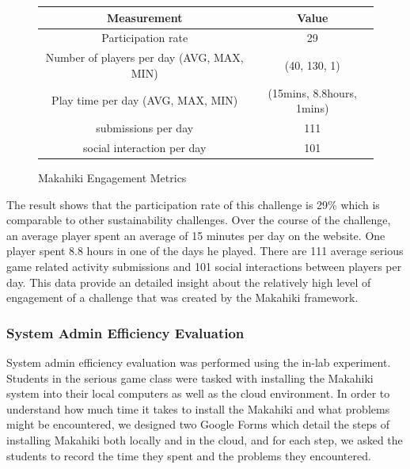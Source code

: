 \documentclass{sigchi}
\newcommand\tabhead[1]{\small\textbf{#1}}
\begin{document}
\begin{figure}[ht!]
  \centering
  \begin{tabular}{|c|c|}
    \hline
    \multicolumn{1}{|p{0.5\columnwidth}|}{\centering\tabhead{Measurement}} &
    \multicolumn{1}{|p{0.5\columnwidth}|}{\centering\tabhead{Value}} \\
    \hline
    \multicolumn{1}{|p{0.5\columnwidth}|}{Participation rate} &
    \multicolumn{1}{|p{0.5\columnwidth}|}{29} \\
    \hline
    \multicolumn{1}{|p{0.5\columnwidth}|}{Number of players per day (AVG, MAX, MIN)} &
    \multicolumn{1}{|p{0.5\columnwidth}|}{(40, 130, 1)} \\
    \hline
    \multicolumn{1}{|p{0.5\columnwidth}|}{Play time per day (AVG, MAX, MIN)} &
    \multicolumn{1}{|p{0.5\columnwidth}|}{(15mins, 8.8hours, 1mins)} \\
    \hline
    \multicolumn{1}{|p{0.5\columnwidth}|}{submissions per day} &
    \multicolumn{1}{|p{0.5\columnwidth}|}{111} \\
    \hline
    \multicolumn{1}{|p{0.5\columnwidth}|}{social interaction per day} &
    \multicolumn{1}{|p{0.5\columnwidth}|}{101} \\
    \hline
  \end{tabular}
  \caption{Makahiki Engagement Metrics}
  \label{fig:makahiki-engagement}
\end{figure}

The result shows that the participation rate of this challenge is 29\% which is comparable to other sustainability challenges. Over the course of the challenge, an average player spent an average of 15 minutes per day on the website. One player spent 8.8 hours in one of the days he played. There are 111 average serious game related activity submissions and 101 social interactions between players per day. This data provide an detailed insight about the relatively high level of engagement of a challenge that was created by the Makahiki framework.

\subsubsection{System Admin Efficiency Evaluation}

System admin efficiency evaluation was performed using the in-lab experiment.
Students in the serious game class were tasked with installing the Makahiki
system into their local computers as well as the cloud environment. In
order to understand how much time it takes to install the Makahiki and
what problems might be encountered, we designed two Google Forms which
detail the steps of installing Makahiki both locally and in the
cloud, and for each step, we asked the students to record the time
they spent and the problems they encountered.
\end{document}

